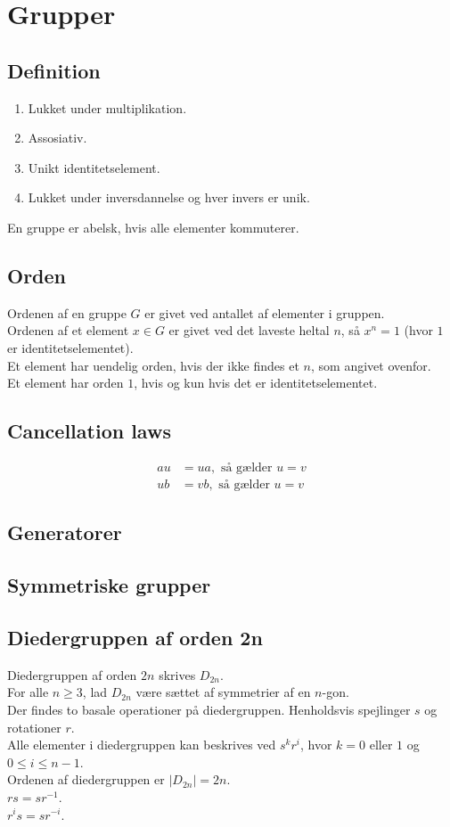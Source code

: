 \documentclass[11pt]{article}
\begin{document}
\section*{Grupper}
\subsection*{Definition}
\begin{enumerate}
  \item Lukket under multiplikation.
  \item Assosiativ.
  \item Unikt identitetselement.
  \item Lukket under inversdannelse og hver invers er unik.
\end{enumerate}

En gruppe er abelsk, hvis alle elementer kommuterer.
\subsection*{Orden}
Ordenen af en gruppe $G$ er givet ved antallet af elementer i gruppen.\\
Ordenen af et element $x \in G$ er givet ved det laveste heltal $n$, så $x^n = 1$ (hvor $1$ er identitetselementet).\\
Et element har uendelig orden, hvis der ikke findes et $n$, som angivet ovenfor.\\
Et element har orden $1$, hvis og kun hvis det er identitetselementet.

\subsection*{Cancellation laws}
\begin{align*}
  au &= ua, \text{ så gælder } u = v\\
  ub &= vb, \text{ så gælder } u = v
\end{align*}
\subsection*{Generatorer}

\subsection*{Symmetriske grupper}

\subsection*{Diedergruppen af orden 2n}
Diedergruppen af orden $2n$ skrives $D_{2n}$.\\
For alle $n \geq 3$, lad $D_{2n}$ være sættet af symmetrier af en $n$-gon.\\
Der findes to basale operationer på diedergruppen. Henholdsvis spejlinger $s$ og rotationer $r$.\\
Alle elementer i diedergruppen kan beskrives ved $s^k r^i$, hvor $k = 0$ eller $1$ og $0 \leq i \leq n-1$.\\
Ordenen af diedergruppen er $|D_{2n}| = 2n$.\\
$r s = s r^{-1}$.\\
$r^i s = s r^{-i}$.
\end{document}
